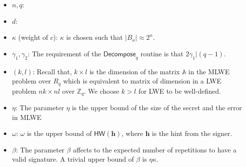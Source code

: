 \documentclass[conference]{IEEEtran}
\begin{document}
		
		\begin{itemize}
			\item $n,q$: 
			\item $d$:
			\item $\kappa$ (weight of $c$):  $\kappa$ is chosen such that $\vert B_{\kappa} \vert\approx 2^{n}$.
			\item $\gamma_1, \gamma_2$: The requirement of the $\textsf{Decompose}_q$ routine is that $2\gamma_1|(q-1)$. 
			\item $(k,l)$: Recall that, $k\times l$ is the dimension of the matrix $\mathbb{A}$ in the \textsf{MLWE} problem over $R_q$ which is equivalent to matrix of dimension in a \textsf{LWE} problem $nk\times nl$ over $\mathbb{Z}_q$. We choose $k>l$ for \textsf{LWE} to be well-defined. 
			\item $\eta$: The parameter $\eta$ is the upper bound of the size of the secret and the error in \textsf{MLWE}
			\item $\omega$: $\omega$ is the upper bound of $\textsf{HW}(\mathbf{h})$, where $\mathbf{h}$ is the hint from the signer.
			
			\item $\beta$: The parameter $\beta$ affects to the expected number of repetitions to have a valid signature. A trivial upper bound of $\beta$ is $\eta\kappa$. 
			
		\end{itemize}
		
		\fi
		
		\fi
		
		
	
\end{document}
